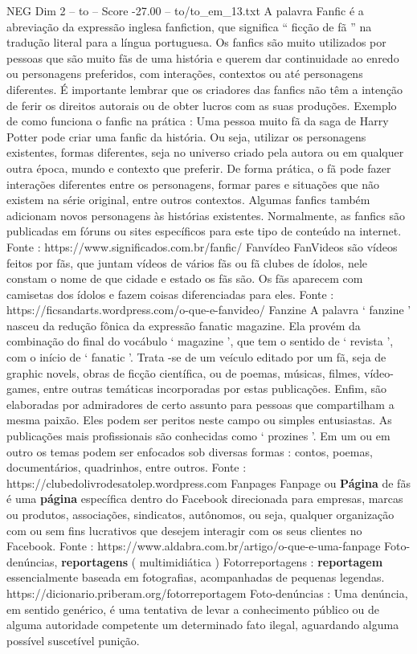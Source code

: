 \begin{textsample}{NEG Dim 2 – to – Score -27.00 – to/to\_em\_13.txt}
A palavra Fanfic é a abreviação da expressão inglesa fanfiction, que significa “ ficção de fã ” na tradução literal para a língua portuguesa.
Os fanfics são muito utilizados por pessoas que são muito fãs de uma história e querem dar continuidade ao enredo ou personagens preferidos, com interações, contextos ou até personagens diferentes.
É importante lembrar que os criadores das fanfics não têm a intenção de ferir os direitos autorais ou de obter lucros com as suas produções.
Exemplo de como funciona o fanfic na prática : Uma pessoa muito fã da saga de Harry Potter pode criar uma fanfic da história.
Ou seja, utilizar os personagens existentes, formas diferentes, seja no universo criado pela autora ou em qualquer outra época, mundo e contexto que preferir.
De forma prática, o fã pode fazer interações diferentes entre os personagens, formar pares e situações que não existem na série original, entre outros contextos.
Algumas fanfics também adicionam novos personagens às histórias existentes.
Normalmente, as fanfics são publicadas em fóruns ou sites específicos para este tipo de conteúdo na internet.
Fonte : https://www.significados.com.br/fanfic/ Fanvídeo FanVideos são vídeos feitos por fãs, que juntam vídeos de vários fãs ou fã clubes de ídolos, nele constam o nome de que cidade e estado os fãs são.
Os fãs aparecem com camisetas dos ídolos e fazem coisas diferenciadas para eles.
Fonte : https://ficsandarts.wordpress.com/o-que-e-fanvideo/ Fanzine A palavra ‘ fanzine ’ nasceu da redução fônica da expressão fanatic magazine.
Ela provém da combinação do final do vocábulo ‘ magazine ’, que tem o sentido de ‘ revista ’, com o início de ‘ fanatic ’.
Trata -se de um veículo editado por um fã, seja de graphic novels, obras de ficção científica, ou de poemas, músicas, filmes, vídeo-games, entre outras temáticas incorporadas por estas publicações.
Enfim, são elaboradas por admiradores de certo assunto para pessoas que compartilham a mesma paixão.
Eles podem ser peritos neste campo ou simples entusiastas.
As publicações mais profissionais são conhecidas como ‘ prozines ’.
Em um ou em outro os temas podem ser enfocados sob diversas formas : contos, poemas, documentários, quadrinhos, entre outros.
Fonte : https://clubedolivrodesatolep.wordpress.com Fanpages Fanpage ou \textbf{Página} de fãs é uma \textbf{página} específica dentro do Facebook direcionada para empresas, marcas ou produtos, associações, sindicatos, autônomos, ou seja, qualquer organização com ou sem fins lucrativos que desejem interagir com os seus clientes no Facebook.
Fonte : https://www.aldabra.com.br/artigo/o-que-e-uma-fanpage Foto-denúncias, \textbf{reportagens} ( multimidiática ) Fotorreportagens : \textbf{reportagem} essencialmente baseada em fotografias, acompanhadas de pequenas legendas. https://dicionario.priberam.org/fotorreportagem Foto-denúncias : Uma denúncia, em sentido genérico, é uma tentativa de levar a conhecimento público ou de alguma autoridade competente um determinado fato ilegal, aguardando alguma possível suscetível punição.

\end{textsample}

